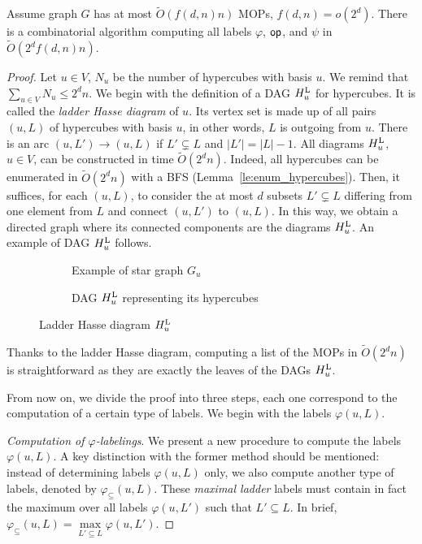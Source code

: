 \documentclass[a4paper,UKenglish,numberwithinsect,cleveref, autoref,anonymous]{lipics-v2021}
\newcommand{\card}[1]{\left| #1 \right|}
\newcommand{\opp}{\mbox{\textsf{op}}}
\newcommand{\hul}{H_u^{\mbox{\scriptsize{L}}}}
\newcommand{\varphis}{\varphi_{\subseteq}}
\begin{document}
\begin{theorem}
Assume graph $G$ has at most $\tilde{O}(f(d,n)n)$ MOPs, $f(d,n) = o(2^d)$. There is a combinatorial algorithm computing all labels $\varphi$, $\opp$, and $\psi$ in $\tilde{O}(2^df(d,n)n)$.
\label{th:labels_mops}
\end{theorem}
\begin{proof}
Let $u \in V$, $N_u$ be the number of hypercubes with basis $u$. 
We remind that $\sum_{u \in V} N_u \le 2^dn$. We begin with the definition of a DAG $\hul$ for hypercubes. It is called the \textit{ladder Hasse diagram} of $u$. Its vertex set is made up of all pairs $(u,L)$ of hypercubes with basis $u$, in other words, $L$ is outgoing from $u$. There is an arc $(u,L')\rightarrow (u,L)$ if $L' \subsetneq L$ and $\card{L'} = \card{L} - 1$. All diagrams $\hul$, $u \in V$, can be constructed in time $\tilde{O}(2^dn)$. Indeed, all hypercubes can be enumerated in $\tilde{O}(2^dn)$ with a BFS (Lemma~\ref{le:enum_hypercubes}). Then, it suffices, for each $(u,L)$, to consider the at most $d$ subsets $L' \subsetneq L$ differing from one element from $L$ and connect $(u,L')$ to $(u,L)$. In this way, we obtain a directed graph where its connected components are the diagrams $\hul$. An example of DAG $\hul$ follows.

\begin{figure}[h]
\centering
\begin{subfigure}[b]{0.49\columnwidth}
\centering
\scalebox{0.9}{}
\caption{Example of star graph $G_u$}
\label{subfig:two_cubes}
\end{subfigure}
\begin{subfigure}[b]{0.49\columnwidth}
\centering
\scalebox{0.9}{}
\caption{DAG $\hul$ representing its hypercubes}
\label{subfig:hul}
\end{subfigure}

\caption{Ladder Hasse diagram $\hul$}
\label{fig:hul}
\end{figure}

Thanks to the ladder Hasse diagram, computing a list of the MOPs in $\tilde{O}(2^dn)$ is straightforward as they are exactly the leaves of the DAGs $\hul$.

From now on, we divide the proof into three steps, each one correspond to the computation of a certain type of labels. We begin with the labels $\varphi(u,L)$. 

\textit{Computation of $\varphi$-labelings}. 
We present a new procedure to compute the labels $\varphi(u,L)$. A key distinction with the former method should be mentioned: instead of determining labels $\varphi(u,L)$ only, we also compute another type of labels, denoted by $\varphis(u,L)$. These \textit{maximal ladder} labels must contain in fact the maximum over all labels $\varphi(u,L')$ such that $L' \subseteq L$. In brief, $\varphis(u,L) = \max\limits_{L' \subseteq L} \varphi(u,L')$.


\end{proof}
\end{document}
